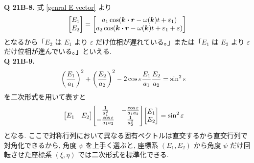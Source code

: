 \documentclass[a4paper,dvipdfmx]{jsarticle}
\theoremstyle{definition}
\begin{document}
\textbf{Q 21B-8.} 式 \eqref{genral E vector} より
\begin{align}
  \mqty[E_1 \\ E_2] = \mqty[a_1\cos(\kk\vdot\rr - \omega(\kk)t + \varepsilon_1) \\ a_2\cos(\kk\vdot\rr - \omega(\kk)t + \varepsilon_1 + \varepsilon)] \label{E12 phase}
\end{align}
となるから「$E_2$ は $E_1$ より $\varepsilon$ だけ位相が遅れている。」または「$E_1$ は $E_2$ より $\varepsilon$ だけ位相が進んでいる。」といえる. \\

\textbf{Q 21B-9.}
\begin{align}
  \qty(\frac{E_1}{a_1})^2 + \qty(\frac{E_2}{a_2})^2 - 2\cos\varepsilon\frac{E_1}{a_1}\frac{E_2}{a_2} & = \sin^2{\varepsilon}
\end{align}
を二次形式を用いて表すと
\begin{align}
  \mqty[E_1 & E_2]\mqty[\frac{1}{a_1^2} & -\frac{\cos\varepsilon}{a_1a_2} \\ -\frac{\cos\varepsilon}{a_1a_2} & \frac{1}{a_2^2}]\mqty[E_1 \\ E_2] & = \sin^2\varepsilon
\end{align}
となる. ここで対称行列において異なる固有ベクトルは直交するから直交行列で対角化できるから, 角度 $\psi$ を上手く選ぶと, 座標系 $(E_1, E_2)$ から角度 $\psi$ だけ回転させた座標系 $(\xi, \eta)$ では二次形式を標準化できる.
\end{document}
